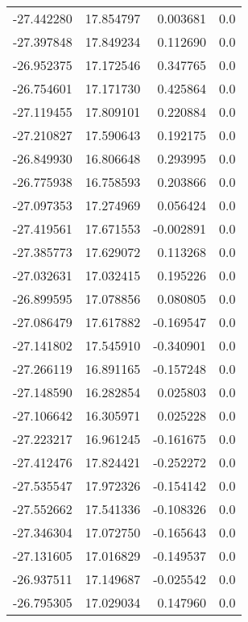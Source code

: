 \begin{tabular}{rrrr}
      -27.442280 &        17.854797 &    0.003681 &   0.0 \\
      -27.397848 &        17.849234 &    0.112690 &   0.0 \\
      -26.952375 &        17.172546 &    0.347765 &   0.0 \\
      -26.754601 &        17.171730 &    0.425864 &   0.0 \\
      -27.119455 &        17.809101 &    0.220884 &   0.0 \\
      -27.210827 &        17.590643 &    0.192175 &   0.0 \\
      -26.849930 &        16.806648 &    0.293995 &   0.0 \\
      -26.775938 &        16.758593 &    0.203866 &   0.0 \\
      -27.097353 &        17.274969 &    0.056424 &   0.0 \\
      -27.419561 &        17.671553 &   -0.002891 &   0.0 \\
      -27.385773 &        17.629072 &    0.113268 &   0.0 \\
      -27.032631 &        17.032415 &    0.195226 &   0.0 \\
      -26.899595 &        17.078856 &    0.080805 &   0.0 \\
      -27.086479 &        17.617882 &   -0.169547 &   0.0 \\
      -27.141802 &        17.545910 &   -0.340901 &   0.0 \\
      -27.266119 &        16.891165 &   -0.157248 &   0.0 \\
      -27.148590 &        16.282854 &    0.025803 &   0.0 \\
      -27.106642 &        16.305971 &    0.025228 &   0.0 \\
      -27.223217 &        16.961245 &   -0.161675 &   0.0 \\
      -27.412476 &        17.824421 &   -0.252272 &   0.0 \\
      -27.535547 &        17.972326 &   -0.154142 &   0.0 \\
      -27.552662 &        17.541336 &   -0.108326 &   0.0 \\
      -27.346304 &        17.072750 &   -0.165643 &   0.0 \\
      -27.131605 &        17.016829 &   -0.149537 &   0.0 \\
      -26.937511 &        17.149687 &   -0.025542 &   0.0 \\
      -26.795305 &        17.029034 &    0.147960 &   0.0 \\

\end{tabular}
